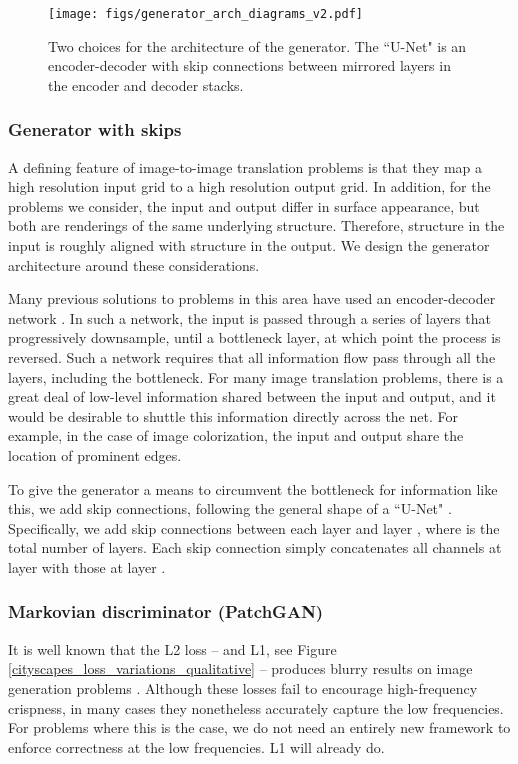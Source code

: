 \documentclass[10pt,twocolumn,letterpaper]{article}
\begin{document}
\begin{figure}[t]
 \centering
 \texttt{[image: figs/generator\_arch\_diagrams\_v2.pdf]}
  \caption{Two choices for the architecture of the generator. The ``U-Net" \cite{ronneberger2015u} is an encoder-decoder with skip connections between mirrored layers in the encoder and decoder stacks.}
 \label{generator_architecture}
\end{figure}

\subsubsection{Generator with skips}
A defining feature of image-to-image translation problems is that they map a high resolution input grid to a high resolution output grid. In addition, for the problems we consider, the input and output differ in surface appearance, but both are renderings of the same underlying structure. Therefore, structure in the input is roughly aligned with structure in the output. We design the generator architecture around these considerations.

Many previous solutions \cite{pathak2016context, wang2016generative, johnson2016perceptual, zhou2016learning, yoo2016pixel} to problems in this area have used an encoder-decoder network \cite{hinton2006reducing}. In such a network, the input is passed through a series of layers that progressively downsample, until a bottleneck layer, at which point the process is reversed. Such a network requires that all information flow pass through all the layers, including the bottleneck. For many image translation problems, there is a great deal of low-level information shared between the input and output, and it would be desirable to shuttle this information directly across the net. For example, in the case of image colorization, the input and output share the location of prominent edges.

To give the generator a means to circumvent the bottleneck for information like this, we add skip connections, following the general shape of a ``U-Net" \cite{ronneberger2015u}. Specifically, we add skip connections between each layer  and layer , where  is the total number of layers. Each skip connection simply concatenates all channels at layer  with those at layer .


\subsubsection{Markovian discriminator (PatchGAN)}
It is well known that the L2 loss -- and L1, see Figure \ref{cityscapes_loss_variations_qualitative} -- produces blurry results on image generation problems \cite{larsen2015autoencoding}. Although these losses fail to encourage high-frequency crispness, in many cases they nonetheless accurately capture the low frequencies. For problems where this is the case, we do not need an entirely new framework to enforce correctness at the low frequencies. L1 will already do.
\end{document}
